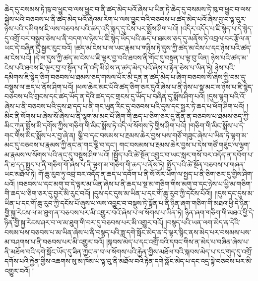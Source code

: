 ཆེད་དུ་བསམས་ཏེ་ཁུ་བ་ཕྱུང་བ་ལས་ཕྱུང་བ་ནི་ཚད་མེད་པའོ་ཞེས་པ་ཡིན་ཏེ་ཆེད་དུ་བསམས་ཏེ་ཁུ་བ་ཕྱུང་བ་ལས་སྐྱེས་པའི་བཅབས་པ་ནི་ཚད་མེད་པའོ་ཞེའམ་རེག་པ་ལས་བྱུང་བའི་བཅབས་པ་ཚད་མེད་པའོ་ཞེས་བྱ་བ་ལྟ་བུར་ཉེས་པའི་དམིགས་ཇི་ལས་བཅབས་པའི་ཚད་འདི་སྐད་དུ་ངེས་པར་སྨྲོས་ཤིག་པའོ། །འདིར་འདོད་པ་ཇི་སྙེད་པ་དེ་སྙེད་དུ་འགྲོ་བར་བསྒྲུབ་ཅེས་པ་ནི་བདག་ལ་ཉེས་པ་ཇི་སྙེད་ཡོད་པའི་ཆད་པ་ཐམས་ཅད་དུ་མནོས་ཏེ་འབྲལ་བར་རྩོལ་ན་ཡང་དེ་བཞིན་དུ་སྦྱར་རུང་བའོ། །ཚད་མ་ངེས་པ་ལ་ཡང་རྣམ་པ་གཉིས་ཏེ་དུས་ཀྱི་ཚད་མ་ངེས་པ་དང་ཉེས་པའི་ཚད་མ་ངེས་པའོ། །དེ་ལ་དུས་ཀྱི་ཚད་མ་ངེས་པ་ཇི་ལྟར་བྱ་བའི་ཐབས་ནི་གོང་དུ་བསྟན་པ་ལྟ་བུ་ཡིན། ཉེས་པའི་ཚད་མ་ངེས་པའི་ཐབས་ཇི་ལྟར་བྱ་བ་སྟོན་པ་ནི་འདི་མི་ཤེས་ན་ཚད་མེད་པའོ་ཞེས་པ་རྟེན་ཅེས་པ་ཡིན་ཏེ། ཉེས་པའི་དམིགས་ཇི་སྙེད་ཅིག་བཅབས་པ་ཐམས་ཅད་གསལ་པོར་མི་དྲན་ན་ཚད་མེད་པ་ཞིག་བཅབས་སོ་ཞེས་སྤྱི་བམ་དུ་བསྡུས་ལ་ཆད་པ་ནོས་ཤིག་པའོ། །ཕལ་ཆེར་མང་པོའི་ཚད་ཅིག་ཅར་དུའོ་ཞེས་པ་ནི་ཉེས་པ་སྣ་མང་ལ་ཉེས་པ་ཇི་སྙེད་བཅབས་པའི་གྲངས་དང་ཚད་ཡོད་ན་དེའི་ཚད་དང་གྲངས་དུ་ཡོད་པ་བཞིན་དུ་སྨོས་ཤིག་པའོ། །དུས་ལྷག་པའི་འོ་ཞེས་པ་ནི་བཅབས་པའི་དུས་ཐ་དད་པ་ནི་གང་ཡུན་རིང་དུ་བཅབས་པའི་དུས་དང་སྦྱར་ཏེ་ཆད་པ་ཕོག་ཤིག་པའོ། །མིང་ནི་སོགས་པ་ཞེས་སོ་ཞེས་པ་ནི་ལྷག་མ་མང་པོ་ཞིག་གི་ཆད་པ་ཅིག་ཅར་དུ་ནོན་ན་བཅབས་པ་ཐམས་ཅད་ཀྱི་མིང་ཀུན་སྨོས་མི་དགོས་ཀྱིས་གཅིག་གི་མིང་སྨོས་ཏེ་འདི་ལ་སོགས་ཏེ་གྱིས་ཤིག་པའོ། །གཅིག་གི་མིང་སྨོས་པ་དེ་གང་གིས་མིང་སྨོས་པར་བྱ་ཞེ་ན། ལྕི་བ་དང་བསམས་པ་རྔམས་ཆེར་བྱས་པས་གཙོ་གཟུང་ཞེས་པ་ཡིན་ཏེ་ལྷག་མ་མང་དུ་བཅབས་པ་རྣམས་ཀྱི་ནང་ན་གང་ལྕི་བ་དང་། གང་བསམས་པ་རྔམས་ཆེར་བྱས་པ་དེས་གཙོ་གཟུང་ལ་ལྷག་མ་རྣམས་ལ་སོགས་པའི་ནང་དུ་བསྡུས་ཤིག་པའོ། །སྤྱོད་པའི་ཚེ་སྔོན་འབྱུང་བ་ཡང་སླར་གསོ་བར་འདོད་ན་དབོག་པ་ནི་ཐ་དད་སྤྱད་པ་ནི་གཅིག་གོ་ཞེས་པ་ནི་ལྷག་མ་གཅིག་གི་ཆད་པ་ནོས་ཏེ། སྤྱོད་པའི་ཚེ་སྔོན་བཅབས་པ་གཞན་ཡང་མཐོལ་ཏེ། གོ་ཆུ་རུབ་ཏུ་འབྲ་བར་འདོད་ན་ཆད་པ་དབོག་པ་ནི་སོ་སོར་ཕོག་ལ་སྤྱད་པ་ནི་ཅིག་ཅར་དུ་གྱིས་ཤིག་པའོ། །བཅབས་པ་དང་མགུ་བ་དེ་ལྟར་མ་ཡིན་ཞེས་པ་ནི་ཆད་པ་སྔ་མ་གཅིག་གིས་མགུ་བ་དང་ཉེས་པ་ཕྱི་མ་གཅིག་གི་ཆད་པ་ཅིག་ཅར་དུ་བྱར་མི་རུང་བའོ། །དུས་དང་དུས་མ་ཡིན་པ་དང་གོ་ཆུ་རུབ་ཀྱི་དངོས་པོའོ།། །།དུས་དང་དུས་མ་ཡིན་པ་དང་གོ་ཆུ་རུབ་ཀྱི་དངོས་པོ་ཞུས་པ་ལས་འབྱུང་བ་བསྡུས་ཏེ་སྟོན་པ་ནི་ཉིན་ཞག་གཅིག་གི་མཐའ་ཕྱི་དེ་ཉིན་གྱི་སྐྱ་རེངས་ལ་མ་ཐུག་ན་བཅབས་པར་མི་འགྱུར་བའོ་ཞེས་པ་ལ་སོགས་པ་ཡིན་ཏེ། ཉིན་ཞག་གཅིག་གི་མཐའ་ཕྱི་དེ་ཉིན་གྱི་སྐྱ་རེངས་ཤར་བ་ལ་མ་ཐུག་གི་བར་དུ་བཅབས་པར་མི་འགྱུར་བའོ། །བསྙད་པའི་ཡན་ལག་མེད་ན་དེའི་བསམ་པས་བཅབས་པ་མ་ཡིན་ཞེས་པ་ནི་བསྙད་པའི་ཟླ་དགེ་སློང་མེད་ན་དེ་ལྟར་སྙིང་ནས་མེད་པར་བསམས་པས་མ་བཤགས་པ་ནི་བཅབས་པར་མི་འགྱུར་བའོ། །སྐབས་མེད་པ་དང་འགྲོ་བའི་དབང་གིས་ན་མེད་པ་བཞིན་ཞེས་པ་ནི་མཐོལ་བའི་དགེ་སློང་ཡོད་དུ་ཟིན་ཀྱང་ན་བ་ལ་སོགས་པའི་རྐྱེན་གྱིས་མཐོལ་བའི་སྐབས་མེད་པ་དང་གུད་དུ་འགྲོ་དགོས་པའི་རྐྱེན་གྱིས་འཆགས་སུ་མ་ཁོམ་པ་ལྟ་བུ་ནི་མཐོལ་བའི་རྟེན་དགེ་སློང་མེད་པ་དང་འདྲ་སྟེ་བཅབས་པར་མི་འགྱུར་བའོ། །
